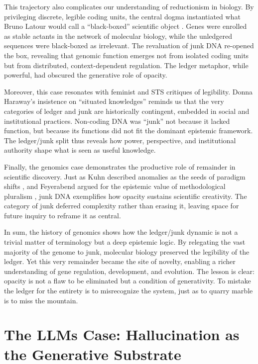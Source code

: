 \documentclass[11pt]{article}
\begin{document}
This trajectory also complicates our understanding of reductionism in biology. By privileging discrete, legible coding units, the central dogma instantiated what Bruno Latour would call a ``black-boxed'' scientific object \citep{latour1987}. Genes were enrolled as stable actants in the network of molecular biology, while the unledgered sequences were black-boxed as irrelevant. The revaluation of junk DNA re-opened the box, revealing that genomic function emerges not from isolated coding units but from distributed, context-dependent regulation. The ledger metaphor, while powerful, had obscured the generative role of opacity.

Moreover, this case resonates with feminist and STS critiques of legibility. Donna Haraway’s insistence on ``situated knowledges'' \citep{haraway1988} reminds us that the very categories of ledger and junk are historically contingent, embedded in social and institutional practices. Non-coding DNA was ``junk'' not because it lacked function, but because its functions did not fit the dominant epistemic framework. The ledger/junk split thus reveals how power, perspective, and institutional authority shape what is seen as useful knowledge.

Finally, the genomics case demonstrates the productive role of remainder in scientific discovery. Just as Kuhn described anomalies as the seeds of paradigm shifts \citep{kuhn1962}, and Feyerabend argued for the epistemic value of methodological pluralism \citep{feyerabend1975}, junk DNA exemplifies how opacity sustains scientific creativity. The category of junk deferred complexity rather than erasing it, leaving space for future inquiry to reframe it as central.

In sum, the history of genomics shows how the ledger/junk dynamic is not a trivial matter of terminology but a deep epistemic logic. By relegating the vast majority of the genome to junk, molecular biology preserved the legibility of the ledger. Yet this very remainder became the site of novelty, enabling a richer understanding of gene regulation, development, and evolution. The lesson is clear: opacity is not a flaw to be eliminated but a condition of generativity. To mistake the ledger for the entirety is to misrecognize the system, just as to quarry marble is to miss the mountain.

\section{The LLMs Case: Hallucination as the Generative Substrate}
\end{document}
